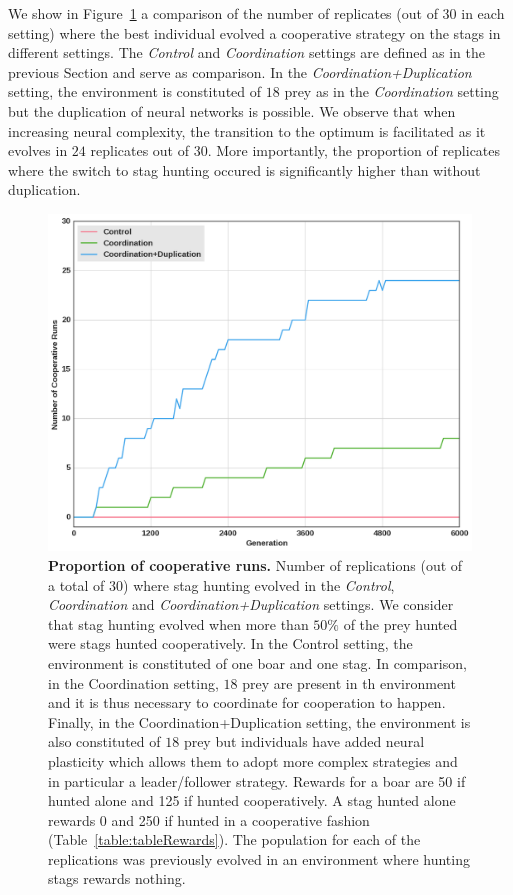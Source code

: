     We show in Figure~\ref{fig:figRecyclingLeadership} a comparison of the number of replicates (out of $30$ in each setting) where the best individual evolved a cooperative strategy on the stags in different settings. The \emph{Control} and \emph{Coordination} settings are defined as in the previous Section and serve as comparison. In the \emph{Coordination+Duplication} setting, the environment is constituted of $18$ prey as in the \emph{Coordination} setting but the duplication of neural networks is possible. We observe that when increasing neural complexity, the transition to the optimum is facilitated as it evolves in $24$ replicates out of $30$. More importantly, the proportion of replicates where the switch to stag hunting occured is significantly higher than without duplication. 

    \begin{figure}[h]
      \centering
        \includegraphics[width=0.7\linewidth]{fig/ArticleBio2/Fig4.png}
        \caption{\textbf{Proportion of cooperative runs.}
        Number of replications (out of a total of $30$) where stag hunting evolved in the \emph{Control}, \emph{Coordination} and \emph{Coordination+Duplication} settings. We consider that stag hunting evolved when more than $50\%$ of the prey hunted were stags hunted cooperatively. In the Control setting, the environment is constituted of one boar and one stag. In comparison, in the Coordination setting, $18$ prey are present in th environment and it is thus necessary to coordinate for cooperation to happen. Finally, in the Coordination+Duplication setting, the environment is also constituted of $18$ prey but individuals have added neural plasticity which allows them to adopt more complex strategies and in particular a leader/follower strategy. Rewards for a boar are 50 if hunted alone and 125 if hunted cooperatively. A stag hunted alone rewards 0 and 250 if hunted in a cooperative fashion (Table~\ref{table:tableRewards}). The population for each of the replications was previously evolved in an environment where hunting stags rewards nothing.}
      \label{fig:figRecyclingLeadership}
    \end{figure}

